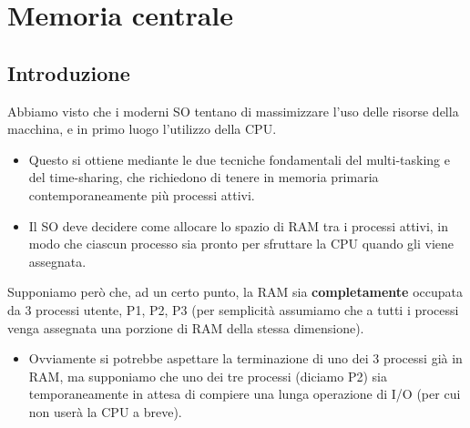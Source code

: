 \chapter{Memoria centrale}
\section{Introduzione}

Abbiamo visto che i moderni SO tentano di massimizzare l'uso delle risorse della macchina, e in primo luogo l'utilizzo della CPU.
\begin{itemize}
    \item Questo si ottiene mediante le due tecniche fondamentali del multi-tasking e del time-sharing, che richiedono di tenere in memoria primaria contemporaneamente più processi attivi.
    \item Il SO deve decidere come allocare lo spazio di RAM tra i
    processi attivi, in modo che ciascun processo sia pronto per
    sfruttare la CPU quando gli viene assegnata.
\end{itemize}

Supponiamo però che, ad un certo punto, la RAM sia \textbf{completamente} occupata da 3 processi utente, P1, P2, P3 (per semplicità assumiamo che a tutti i processi venga assegnata una porzione di RAM della stessa dimensione).


\begin{itemize}
    \item Ovviamente si potrebbe aspettare la terminazione di uno dei
    3 processi già in RAM, ma supponiamo che uno dei tre
    processi (diciamo P2) sia temporaneamente in attesa di
    compiere una lunga operazione di I/O (per cui non userà la
    CPU a breve).
\end{itemize}

